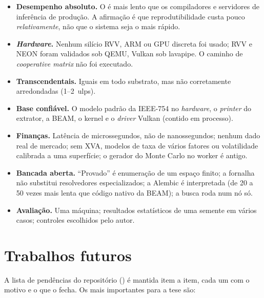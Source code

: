 \begin{itemize}
  \item \textbf{Desempenho absoluto.} O \vapor{} é mais lento que os compiladores e servidores de inferência de produção. A afirmação é que reprodutibilidade custa pouco \emph{relativamente}, não que o sistema seja o mais rápido.
  \item \textbf{\textit{Hardware}.} Nenhum silício RVV, ARM ou GPU discreta foi usado; RVV e NEON foram validados sob QEMU, Vulkan sob lavapipe. O caminho de \textit{cooperative matrix} não foi executado.
  \item \textbf{Transcendentais.} Iguais em todo substrato, mas não corretamente arredondadas (1--2~ulps).
  \item \textbf{Base confiável.} O modelo padrão da IEEE-754 no \textit{hardware}, o \textit{printer} do extrator, a BEAM, o kernel e o \textit{driver} Vulkan (contido em processo).
  \item \textbf{Finanças.} Latência de microssegundos, não de nanossegundos; nenhum dado real de mercado; sem XVA, modelos de taxa de vários fatores ou volatilidade calibrada a uma superfície; o gerador do Monte Carlo no worker é antigo.
  \item \textbf{Bancada aberta.} ``Provado'' é enumeração de um espaço finito; a fornalha não substitui resolvedores especializados; a Alembic é interpretada (de 20 a 50 vezes mais lenta que código nativo da BEAM); a busca roda num nó só.
  \item \textbf{Avaliação.} Uma máquina; resultados estatísticos de uma semente em vários casos; controles escolhidos pelo autor.
\end{itemize}

\section{Trabalhos futuros}

A lista de pendências do repositório () é mantida item a item, cada um com o motivo e o que o fecha. Os mais importantes para a tese são:

